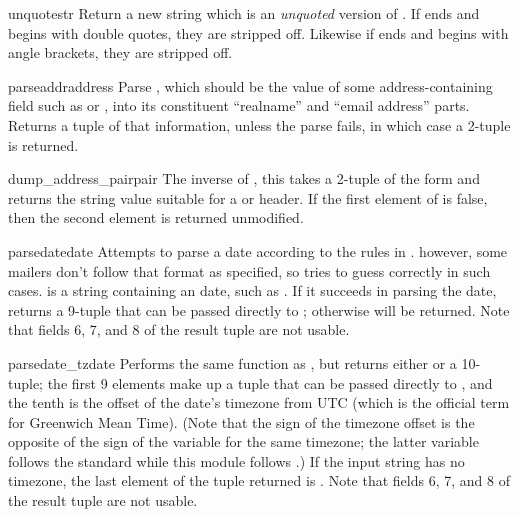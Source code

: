\begin{funcdesc}{unquote}{str}
Return a new string which is an \emph{unquoted} version of .
If  ends and begins with double quotes, they are stripped
off.  Likewise if  ends and begins with angle brackets, they
are stripped off.
\end{funcdesc}

\begin{funcdesc}{parseaddr}{address}
Parse , which should be the value of some
address-containing field such as  or ,
into its constituent ``realname'' and ``email address'' parts.
Returns a tuple of that information, unless the parse fails, in which
case a 2-tuple  is returned.
\end{funcdesc}

\begin{funcdesc}{dump_address_pair}{pair}
The inverse of , this takes a 2-tuple of the form
 and returns the string
value suitable for a  or  header.  If
the first element of  is false, then the second element is
returned unmodified.
\end{funcdesc}

\begin{funcdesc}{parsedate}{date}
Attempts to parse a date according to the rules in .
however, some mailers don't follow that format as specified, so
 tries to guess correctly in such cases. 
 is a string containing an  date, such as 
.  If it succeeds in parsing
the date,  returns a 9-tuple that can be passed
directly to ; otherwise  will be
returned.  Note that fields 6, 7, and 8 of the result tuple are not
usable.
\end{funcdesc}

\begin{funcdesc}{parsedate_tz}{date}
Performs the same function as , but returns
either  or a 10-tuple; the first 9 elements make up a tuple
that can be passed directly to , and the tenth
is the offset of the date's timezone from UTC (which is the official
term for Greenwich Mean Time).  (Note that the sign of the timezone
offset is the opposite of the sign of the 
variable for the same timezone; the latter variable follows the
\POSIX{} standard while this module follows .)  If the input
string has no timezone, the last element of the tuple returned is
.  Note that fields 6, 7, and 8 of the result tuple are not
usable.
\end{funcdesc}

